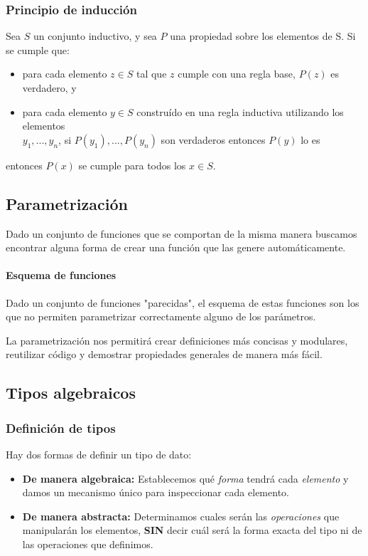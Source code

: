 \subsubsection{Principio de inducción}
Sea $S$ un conjunto inductivo, y sea $P$ una propiedad sobre los elementos de S. Si se cumple que:
\begin{itemize}
	\item para cada elemento $z\in S$ tal que $z$ cumple con una regla base, $P(z)$ es verdadero, y
	\item para cada elemento $y\in S$ construído en una regla inductiva utilizando los elementos \\ $y_1, ..., y_n$, si $P(y_1 ), ..., P(y_n)$ son verdaderos entonces $P(y)$ lo es
	
\end{itemize}

entonces $P(x)$ se cumple para todos los $x\in S$.

\subsection{Parametrización}
Dado un conjunto de funciones que se comportan de la misma manera buscamos encontrar alguna forma de crear una función que las genere automáticamente. 

\paragraph{Esquema de funciones} Dado un conjunto de funciones "parecidas", el esquema de estas funciones son los que no permiten parametrizar correctamente alguno de los parámetros.

La parametrización nos permitirá crear definiciones más concisas y modulares, reutilizar código y demostrar propiedades generales de manera más fácil.

\subsection{Tipos algebraicos}

\subsubsection{Definición de tipos}
Hay dos formas de definir un tipo de dato:
\begin{itemize}
	\item \textbf{De manera algebraica:} Establecemos qué \textit{forma} tendrá cada \textit{elemento} y damos un mecanismo único para inspeccionar cada elemento.
	\item \textbf{De manera abstracta:} Determinamos cuales serán las \textit{operaciones} que manipularán los elementos, \textbf{SIN} decir cuál será la forma exacta del tipo ni de las operaciones que definimos.
\end{itemize}

